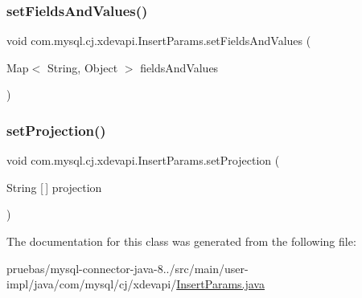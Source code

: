 \subsubsection{\texorpdfstring{set\+Fields\+And\+Values()}{setFieldsAndValues()}}
{\footnotesize\ttfamily void com.\+mysql.\+cj.\+xdevapi.\+Insert\+Params.\+set\+Fields\+And\+Values (\begin{DoxyParamCaption}\item[{Map$<$ String, Object $>$}]{fields\+And\+Values }\end{DoxyParamCaption})}

\mbox{\label{classcom_1_1mysql_1_1cj_1_1xdevapi_1_1_insert_params_a24fc565a32e226e50102e0acceaedad1}} 
\subsubsection{\texorpdfstring{set\+Projection()}{setProjection()}}
{\footnotesize\ttfamily void com.\+mysql.\+cj.\+xdevapi.\+Insert\+Params.\+set\+Projection (\begin{DoxyParamCaption}\item[{String \mbox{[}$\,$\mbox{]}}]{projection }\end{DoxyParamCaption})}



The documentation for this class was generated from the following file\+:\begin{DoxyCompactItemize}
\item 
pruebas/mysql-\/connector-\/java-\/8../src/main/user-\/impl/java/com/mysql/cj/xdevapi/\mbox{\hyperlink{_insert_params_8java}{Insert\+Params.\+java}}\end{DoxyCompactItemize}
